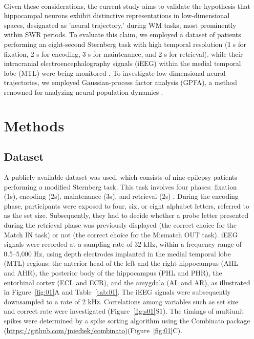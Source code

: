 \documentclass[final,3p,times,twocolumn]{elsarticle}
\begin{document}
\\
\indent
Given these considerations, the current study aims to validate the hypothesis that hippocampal neurons exhibit distinctive representations in low-dimensional spaces, designated as 'neural trajectory,' during WM tasks, most prominently within SWR periods. To evaluate this claim, we employed a dataset of patients performing an eight-second Sternberg task with high temporal resolution (1 s for fixation, 2 s for encoding, 3 s for maintenance, and 2 s for retrieval), while their intracranial electroencephalography signals (iEEG) within the medial temporal lobe (MTL) were being monitored \cite{boran_dataset_2020}. To investigate low-dimensional neural trajectories, we employed Gaussian-process factor analysis (GPFA), a method renowned for analyzing neural population dynamics \cite{yu_gaussian-process_2009}.
\label{sec:introduction}
\section{Methods}
\subsection{Dataset}
A publicly available dataset \cite{boran_dataset_2020} was used, which consists of nine epilepsy patients performing a modified Sternberg task. This task involves four phases: fixation (1s), encoding (2s), maintenance (3s), and retrieval (2s) \cite{boran_dataset_2020}. During the encoding phase, participants were exposed to four, six, or eight alphabet letters, referred to as the set size. Subsequently, they had to decide whether a probe letter presented during the retrieval phase was previously displayed (the correct choice for the Match IN task) or not (the correct choice for the Mismatch OUT task). iEEG signals were recorded at a sampling rate of 32 kHz, within a frequency range of 0.5--5,000 Hz, using depth electrodes implanted in the medial temporal lobe (MTL) regions: the anterior head of the left and the right hippocampus (AHL and AHR), the posterior body of the hippocampus (PHL and PHR), the entorhinal cortex (ECL and ECR), and the amygdala (AL and AR), as illustrated in Figure~\ref{fig:01}A and Table~\ref{tab:01}. The iEEG signals were subsequently downsampled to a rate of 2 kHz. Correlations among variables such as set size and correct rate were investigated (Figure~\ref{fig:s01}S1). The timings of multiunit spikes were determined by a spike sorting algorithm \cite{niediek_reliable_2016} using the Combinato package (\url{https://github.com/jniediek/combinato})(Figure~\ref{fig:01}C).
\end{document}
